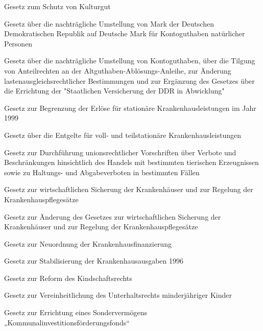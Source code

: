 \item[{KGSG}] Gesetz zum Schutz von Kulturgut

\item[{KGUG}] Gesetz über die nachträgliche Umstellung von Mark der Deutschen Demokratischen Republik auf Deutsche Mark für Kontoguthaben natürlicher Personen

\item[{KGUGEG}] Gesetz über die nachträgliche Umstellung von Kontoguthaben, über die Tilgung von Anteilrechten an der Altguthaben-Ablösungs-Anleihe, zur Änderung lastenausgleichsrechtlicher Bestimmungen und zur Ergänzung des Gesetzes über die Errichtung der "Staatlichen Versicherung der DDR in Abwicklung"

\item[{KHBegrG-1999}] Gesetz zur Begrenzung der Erlöse für stationäre Krankenhausleistungen im Jahr 1999

\item[{KHEntgG}] Gesetz über die Entgelte für voll- und teilstationäre Krankenhausleistungen

\item[{KHfEVerbG}] Gesetz zur Durchführung unionsrechtlicher Vorschriften über Verbote und Beschränkungen hinsichtlich des Handels mit bestimmten tierischen Erzeugnissen sowie zu Haltungs- und Abgabeverboten in bestimmten Fällen

\item[{KHG}] Gesetz zur wirtschaftlichen Sicherung der Krankenhäuser und zur Regelung der Krankenhauspflegesätze

\item[{KHKG}] Gesetz zur Änderung des Gesetzes zur wirtschaftlichen Sicherung der Krankenhäuser und zur Regelung der Krankenhauspflegesätze

\item[{KHNG}] Gesetz zur Neuordnung der Krankenhausfinanzierung

\item[{KHStabG-1996}] Gesetz zur Stabilisierung der Krankenhausausgaben 1996

\item[{KindRG}] Gesetz zur Reform des Kindschaftsrechts

\item[{KindUG}] Gesetz zur Vereinheitlichung des Unterhaltsrechts minderjähriger Kinder

\item[{KInvFErrG}] Gesetz zur Errichtung eines Sondervermögens „Kommunalinvestitionsförderungsfonds“

